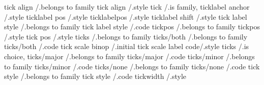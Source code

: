 tick align           /.belongs to family
tick align           /.style
tick                 /.is family,
ticklabel anchor     /.style
ticklabel pos        /.style
ticklabelpos         /.style
ticklabel shift      /.style
tick label style     /.belongs to family
tick label style     /.code
tickpos              /.belongs to family
tickpos              /.style
tick pos             /.style
ticks                /.belongs to family
ticks/both           /.belongs to family
ticks/both           /.code
tick scale binop     /.initial
tick scale label code/.style
ticks                /.is choice,
ticks/major          /.belongs to family
ticks/major          /.code
ticks/minor          /.belongs to family
ticks/minor          /.code
ticks/none           /.belongs to family
ticks/none           /.code
tick style           /.belongs to family
tick style           /.code
tickwidth            /.style

